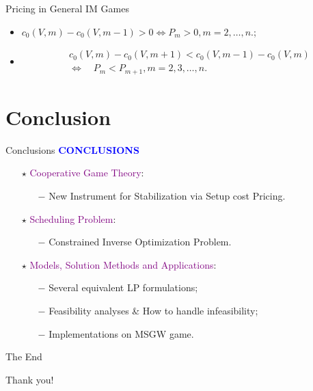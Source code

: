 \documentclass[14pt]{beamer}
\begin{document}
\begin{frame}{Pricing in General IM Games}
	\begin{itemize}
	\justifying
		\item $c_0(V,m)- c_0(V,m-1) > 0 \Leftrightarrow P_m > 0, m=2,\ldots,n.$;
		\item
		\begin{equation*}
			\begin{aligned}
				&c_0 (V,m) - c_0 (V,m+1) < c_0 (V,m-1) - c_0 (V,m) \\
				&\Leftrightarrow \quad P_m < P_{m+1} , m=2,3,\ldots,n.
			\end{aligned}
		\end{equation*}
	\end{itemize}
\end{frame}

\section{Conclusion}
\begin{frame}{Conclusions}
\centering
\large
\vspace{1mm}
\textcolor{blue}{\bf {\huge C}ONCLUSIONS}
\vspace{2mm}
\begin{itemize}
\normalsize
\justifying
\item[$\star$] \textcolor{purple}{Cooperative Game Theory}:
\begin{itemize}
\small
\vspace{2mm}
\item[$-$] {New Instrument for Stabilization via Setup cost Pricing}.
\vspace{2mm}
\end{itemize}
\item[$\star$] \textcolor{purple}{Scheduling Problem}:
\begin{itemize}
\small
\vspace{2mm}
\item[$-$] Constrained Inverse Optimization Problem.
\vspace{2mm}
\end{itemize}
\item[$\star$] \textcolor{purple}{Models, Solution Methods and Applications}:
\begin{itemize}
\small
\vspace{2mm}
\item[$-$] Several equivalent LP formulations;
\vspace{2mm}
\item[$-$] Feasibility analyses \& How to handle infeasibility;
\vspace{2mm}
\item[$-$] Implementations on MSGW game.
\end{itemize}
\end{itemize}
\end{frame}

\begin{frame}{The End}
\begin{center}
	\begin{LARGE}
		Thank you!
	\end{LARGE}
\end{center}
\end{frame}
\end{document}
